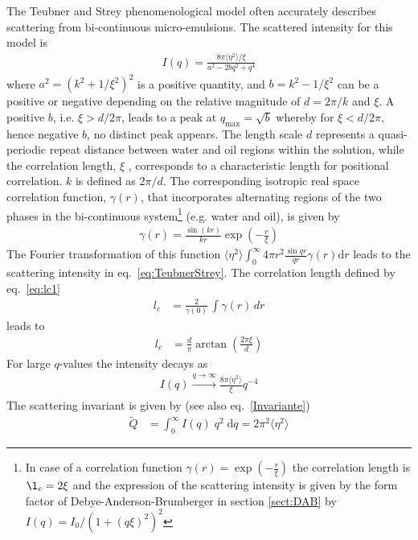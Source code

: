 The Teubner and Strey \cite{TeubnerStrey87,StreyKlineKaler1994,Sottmann1997}
phenomenological model often accurately describes scattering from
bi-continuous micro-emulsions. The scattered intensity for this
model is
\begin{align}
I(q) = \frac{8\pi\langle\eta^2\rangle/\xi}{a^2-2bq^2+q^4}
\label{eq:TeubnerStrey}
\end{align}
where $a^2=(k^2+1/\xi^2)^2$ is a positive quantity, and
$b=k^2-1/\xi^2$ can be a positive or negative depending on the
relative magnitude of $d=2\pi/k$ and $\xi$. A positive $b$, i.e.
$\xi>d/2\pi$, leads to a peak at $q_\text{max}=\sqrt{b}$ whereby for
$\xi<d/2\pi$, hence negative $b$, no distinct peak appears. The
length scale $d$ represents a quasi-periodic repeat distance between
water and oil regions within the solution, while the correlation
length, $\xi$ , corresponds to a characteristic length for
positional correlation. $k$ is defined as $2\pi/d$. The
corresponding isotropic real space correlation function,
$\gamma(r)$, that incorporates alternating regions of the two phases
in the bi-continuous system\footnote{
In case of a correlation function $\gamma(r)=\exp\left(-\frac{r}{\xi} \right)$
the correlation length is $\l_c=2\xi$ and the expression of the scattering intensity is given by the form factor of
Debye-Anderson-Brumberger in section \ref{sect:DAB} by $I(q)=I_0/(1+(q\xi)^2)^2$}
(e.g. water and oil), is given by
\begin{align}
\gamma(r) = \frac{\sin(kr)}{kr} \exp\left(-\frac{r}{\xi} \right)
\end{align}
The Fourier transformation of this function
$\langle\eta^2\rangle \int_0^\infty 4\pi r^2 \frac{\sin qr}{qr}\gamma(r)\mathrm{d}r$
leads to the scattering intensity in eq.\ \ref{eq:TeubnerStrey}.
The correlation length defined by eq.\ \ref{eq:lc1}
\begin{align}
l_c &= \frac{2}{\gamma(0)}\, \int \gamma(r) \, dr
\end{align}
leads to
\begin{align}
l_c &= \frac{d}{\pi} \arctan\left(\frac{2 \pi  \xi }{d}\right)
\label{eq:lcTS}
\end{align}
For large $q$-values the intensity decays as
\begin{align}
I(q)\xrightarrow[]{q\rightarrow\infty} \frac{8\pi\langle\eta^2\rangle}{\xi} q^{-4}
\label{eq:TSc4}
\end{align}
The scattering invariant is given by (see also eq.\ \ref{Invariante})
\begin{align}
\widetilde{Q} &= \int_0^\infty I(q)\; q^2 \;\mathrm{d}q = 2\pi^2 \langle\eta^2\rangle
\end{align}
